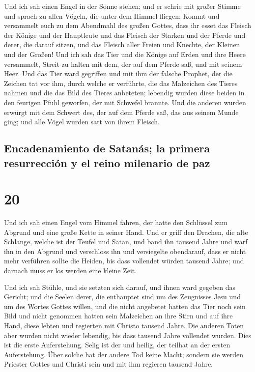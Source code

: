  Und ich sah einen Engel in der Sonne stehen; und er
schrie mit großer Stimme und sprach zu allen Vögeln, die unter dem
Himmel fliegen: Kommt und versammelt euch zu dem Abendmahl des großen
Gottes,  dass ihr esset das Fleisch der Könige und der
Hauptleute und das Fleisch der Starken und der Pferde und derer, die
darauf sitzen, und das Fleisch aller Freien und Knechte, der Kleinen und
der Großen!  Und ich sah das Tier und die Könige auf
Erden und ihre Heere versammelt, Streit zu halten mit dem, der auf dem
Pferde saß, und mit seinem Heer.  Und das Tier ward
gegriffen und mit ihm der falsche Prophet, der die Zeichen tat vor ihm,
durch welche er verführte, die das Malzeichen des Tieres nahmen und die
das Bild des Tieres anbeteten; lebendig wurden diese beiden in den
feurigen Pfuhl geworfen, der mit Schwefel brannte.  Und
die anderen wurden erwürgt mit dem Schwert des, der auf dem Pferde saß,
das aus seinem Munde ging; und alle Vögel wurden satt von ihrem Fleisch.

\hypertarget{encadenamiento-de-satanuxe1s-la-primera-resurrecciuxf3n-y-el-reino-milenario-de-paz}{%
\subsection{Encadenamiento de Satanás; la primera resurrección y el
reino milenario de
paz}\label{encadenamiento-de-satanuxe1s-la-primera-resurrecciuxf3n-y-el-reino-milenario-de-paz}}

\hypertarget{section-19}{%
\section{20}\label{section-19}}

 Und ich sah einen Engel vom Himmel fahren, der hatte den
Schlüssel zum Abgrund und eine große Kette in seiner Hand.
 Und er griff den Drachen, die alte Schlange, welche ist
der Teufel und Satan, und band ihn tausend Jahre  und warf
ihn in den Abgrund und verschloss ihn und versiegelte obendarauf, dass
er nicht mehr verführen sollte die Heiden, bis dass vollendet würden
tausend Jahre; und darnach muss er los werden eine kleine Zeit.

 Und ich sah Stühle, und sie setzten sich darauf, und
ihnen ward gegeben das Gericht; und die Seelen derer, die enthauptet
sind um des Zeugnisses Jesu und um des Wortes Gottes willen, und die
nicht angebetet hatten das Tier noch sein Bild und nicht genommen hatten
sein Malzeichen an ihre Stirn und auf ihre Hand, diese lebten und
regierten mit Christo tausend Jahre.  Die anderen Toten
aber wurden nicht wieder lebendig, bis dass tausend Jahre vollendet
wurden. Dies ist die erste Auferstehung.  Selig ist der
und heilig, der teilhat an der ersten Auferstehung. Über solche hat der
andere Tod keine Macht; sondern sie werden Priester Gottes und Christi
sein und mit ihm regieren tausend Jahre.

